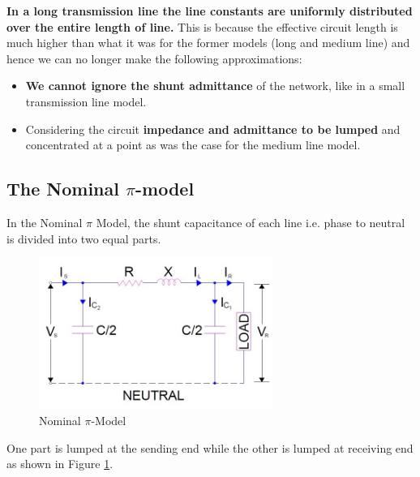 \documentclass[12pt]{article}
\begin{document}
  {\bf In a long transmission line the line constants are uniformly 
  distributed over the entire length of line.} This is because the 
  effective circuit length is much higher than what it was for the 
  former models (long and medium line) and hence we can no longer 
  make the following approximations:
    \begin{itemize}
      \item {\bf We cannot ignore the shunt admittance} of the network, 
      like in a small transmission line model.
      \item Considering the circuit {\bf impedance and admittance to be 
      lumped} and concentrated at a point as was the case for the 
      medium line model.
    \end{itemize}

    \pagebreak
    \subsection{The Nominal $\pi$-model}
    In the Nominal $\pi$ Model, the shunt capacitance of each line i.e. 
    phase to neutral is divided into two equal parts. 

    \begin{figure}[H]
      \begin{center}
        \includegraphics[width=3in]{img/Nominal-pi-method.jpg}
        \caption{Nominal $\pi$-Model}
        \label{nominal-pi}
      \end{center}
    \end{figure}

    One part is lumped at the sending end while the other is lumped at 
    receiving end as shown in Figure \ref{nominal-pi}.
\end{document}

